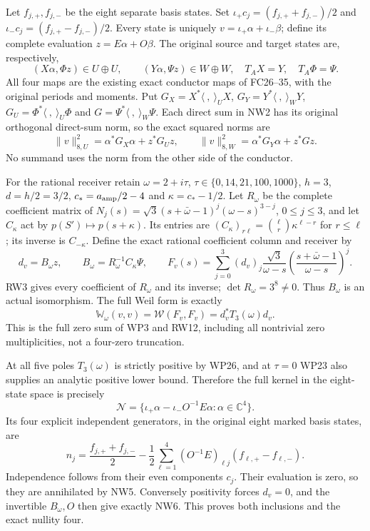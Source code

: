 \documentclass[11pt]{article}
\providecommand{\W}{\mathcal W}
\newcommand{\C}{\mathbb C}
\begin{document}
Let $f_{j,+},f_{j,-}$ be the eight separate basis states.
Set $\iota_+c_j=(f_{j,+}+f_{j,-})/2$ and
$\iota_-c_j=(f_{j,+}-f_{j,-})/2$. Every state is uniquely
$v=\iota_+\alpha+\iota_-\beta$; define its complete evaluation
$z=E\alpha+O\beta$. The original source and target states
are, respectively,
\[
 (X\alpha,\Phi z)\in U\oplus U,\qquad
 (Y\alpha,\Psi z)\in W\oplus W,
 \quad T_AX=Y,\quad T_A\Phi=\Psi.
 \tag{NW2}
\]
All four maps are the existing exact conductor maps of
FC26--35, with the original periods and moments. Put
$G_X=X^*\langle\ ,\ \rangle_U X$,
$G_Y=Y^*\langle\ ,\ \rangle_W Y$,
$G_U=\Phi^*\langle\ ,\ \rangle_U\Phi$ and
$G=\Psi^*\langle\ ,\ \rangle_W\Psi$.
Each direct sum in NW2 has its original orthogonal direct-sum
norm, so the exact squared norms are
\[
 \|v\|_{8,U}^2=\alpha^*G_X\alpha+z^*G_Uz,
 \qquad
 \|v\|_{8,W}^2=\alpha^*G_Y\alpha+z^*Gz.
 \tag{NW3}
\]
No summand uses the norm from the other side of the conductor.

For the rational receiver retain
$\omega=2+i\tau$, $\tau\in\{0,14,21,100,1000\}$,
$h=3$, $d=h/2=3/2$, $c_*=a_{\rm amp}/2-4$ and
$\kappa=c_*-1/2$. Let $R_\omega$ be the complete coefficient
matrix of
$N_j(s)=\sqrt3(s+\bar\omega-1)^j(\omega-s)^{3-j}$,
$0\le j\le3$, and let $C_\kappa$ act by
$p(S')\mapsto p(s+\kappa)$. Its entries are
$(C_\kappa)_{r\ell}=\binom\ell r\kappa^{\ell-r}$ for
$r\le\ell$; its inverse is $C_{-\kappa}$. Define the exact
rational coefficient column and receiver by
\[
 d_v=B_\omega z,\qquad B_\omega=R_\omega^{-1}C_\kappa\Psi,
 \qquad
 F_v(s)=\sum_{j=0}^3(d_v)_j\frac{\sqrt3}{\omega-s}
                     \left(\frac{s+\bar\omega-1}{\omega-s}\right)^j.
 \tag{NW4}
\]
RW3 gives every coefficient of $R_\omega$ and its inverse;
$\det R_\omega=3^8\ne0$. Thus $B_\omega$ is an actual
isomorphism. The full Weil form is exactly
\[
 \mathbb W_\omega(v,v)=\W(F_v,F_v)=d_v^*T_3(\omega)d_v.
 \tag{NW5}
\]
This is the full zero sum of WP3 and RW12, including all
nontrivial zero multiplicities, not a four-zero truncation.

At all five poles $T_3(\omega)$ is strictly positive by
WP26, and at $\tau=0$ WP23 also supplies an analytic positive
lower bound. Therefore the full kernel in the eight-state
space is precisely
\[
 \mathcal N=\{\iota_+\alpha-\iota_-O^{-1}E\alpha:
                              \alpha\in\C^4\}.
 \tag{NW6}
\]
Its four explicit independent generators, in the original
eight marked basis states, are
\[
 n_j=\frac{f_{j,+}+f_{j,-}}2
       -\frac12\sum_{\ell=1}^4(O^{-1}E)_{\ell j}
                                      (f_{\ell,+}-f_{\ell,-}).
 \tag{NW7}
\]
Independence follows from their even components $c_j$.
Their evaluation is zero, so they are annihilated by NW5.
Conversely positivity forces $d_v=0$, and the invertible
$B_\omega,O$ then give exactly NW6. This proves both
inclusions and the exact nullity four.
\end{document}
